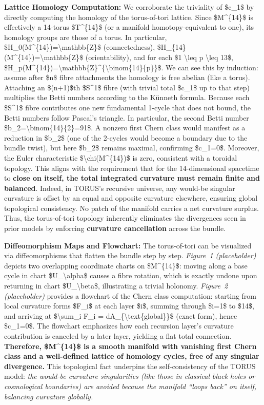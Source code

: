 \documentclass[]{article}
\begin{document}
\textbf{Lattice Homology Computation:} We corroborate the triviality of
\$c\_1\$ by directly computing the homology of the torus-of-tori
lattice. Since \$M\^{}\{14\}\$ is effectively a 14-torus \$T\^{}\{14\}\$
(or a manifold homotopy-equivalent to one), its homology groups are
those of a torus. In particular,
\$H\_0(M\^{}\{14\})=\textbackslash{}mathbb\{Z\}\$ (connectedness),
\$H\_\{14\}(M\^{}\{14\})=\textbackslash{}mathbb\{Z\}\$ (orientability),
and for each \$1 \textbackslash{}leq p \textbackslash{}leq 13\$,
\$H\_p(M\^{}\{14\})=\textbackslash{}mathbb\{Z\}\^{}\{\textbackslash{}binom\{14\}\{p\}\}\$.
We can see this by induction: assume after \$n\$ fibre attachments the
homology is free abelian (like a torus). Attaching an \$(n+1)\$th
\$S\^{}1\$ fibre (with trivial total \$c\_1\$ up to that step)
multiplies the Betti numbers according to the Künneth formula. Because
each \$S\^{}1\$ fibre contributes one new fundamental 1-cycle that does
not bound, the Betti numbers follow Pascal's triangle. In particular,
the second Betti number \$b\_2=\textbackslash{}binom\{14\}\{2\}=91\$. A
nonzero first Chern class would manifest as a reduction in \$b\_2\$ (one
of the 2-cycles would become a boundary due to the bundle twist), but
here \$b\_2\$ remains maximal, confirming \$c\_1=0\$. Moreover, the
Euler characteristic \$\textbackslash{}chi(M\^{}\{14\})\$ is zero,
consistent with a toroidal topology. This aligns with the requirement
that for the 14-dimensional spacetime to \textbf{close on itself, the
total integrated curvature must remain finite and balanced}​. Indeed, in
TORUS's recursive universe, any would-be singular curvature is offset by
an equal and opposite curvature elsewhere, ensuring global topological
consistency. No patch of the manifold carries a net curvature surplus​.
Thus, the torus-of-tori topology inherently eliminates the divergences
seen in prior models by enforcing \textbf{curvature cancellation} across
the bundle.

\textbf{Diffeomorphism Maps and Flowchart:} The torus-of-tori can be
visualized via diffeomorphisms that flatten the bundle step by step.
\emph{Figure~1 (placeholder)} depicts two overlapping coordinate charts
on \$M\^{}\{14\}\$: moving along a base cycle in chart
\$U\_\textbackslash{}alpha\$ causes a fibre rotation, which is exactly
undone upon returning in chart \$U\_\textbackslash{}beta\$, illustrating
a trivial holonomy. \emph{Figure~2 (placeholder)} provides a flowchart
of the Chern class computation: starting from local curvature forms
\$F\_i\$ at each layer \$i\$, summing through \$i=1\$ to \$14\$, and
arriving at \$\textbackslash{}sum\_i F\_i =
dA\_\{\textbackslash{}text\{global\}\}\$ (exact form), hence \$c\_1=0\$.
The flowchart emphasizes how each recursion layer's curvature
contribution is canceled by a later layer, yielding a flat total
connection. \textbf{Therefore, \$M\^{}\{14\}\$ is a smooth manifold with
vanishing first Chern class and a well-defined lattice of homology
cycles, free of any singular divergence.} This topological fact
underpins the self-consistency of the TORUS model: \emph{the would-be
curvature singularities (like those in classical black holes or
cosmological boundaries) are avoided because the manifold ``loops back''
on itself, balancing curvature globally​.}
\end{document}
